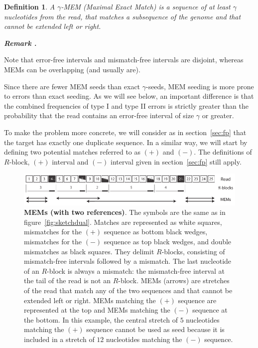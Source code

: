 \documentclass{article}
\newtheorem{definition}{Definition}
\newcounter{remarkcounter}
\newenvironment{remark}
{\small\it\vspace{0.5\baselineskip}
  \refstepcounter{remarkcounter}%
  \noindent\textbf{Remark \arabic{remarkcounter}.}%
}{\vspace{0.5\baselineskip}}
\begin{document}
\begin{definition}
A $\gamma$-MEM (Maximal Exact Match) is a sequence of at least $\gamma$
nucleotides from the read, that matches a subsequence of the genome and
that cannot be extended left or right.
\end{definition}

\begin{remark}
Note that error-free intervals and mismatch-free intervals are disjoint,
whereas MEMs can be overlapping (and usually are).
\end{remark}

Since there are fewer MEM seeds than exact $\gamma$-seeds, MEM seeding is
more prone to errors than exact seeding. As we will see below, an
important difference is that the combined frequencies of type I and type
II errors is strictly greater than the probability that the read contains
an error-free interval of size $\gamma$ or greater.


To make the problem more concrete, we will consider as in
section~\ref{sec:fp} that the target has exactly one duplicate sequence.
In a similar way, we will start by defining two potential matches referred
to as $(+)$ and $(-)$. The definitions of $R$-block, $(+)$ interval and
$(-)$ interval given in section~\ref{sec:fp} still apply.


\begin{figure}[h]
\centering
\includegraphics[scale=0.88]{sketch_MEM.pdf}
\caption{\textbf{MEMs (with two references)}. The symbols are the
same as in figure~\ref{fig:sketchdual}. Matches are represented as white
squares, mismatches for the $(+)$ sequence as bottom black wedges,
mismatches for the $(-)$ sequence as top black wedges, and double
mismatches as black squares. They delimit $R$-blocks, consisting of
mismatch-free intervals followed by a mismatch. The last nucleotide of
an $R$-block is always a mismatch: the mismatch-free interval at the
tail of the read is not an $R$-block. MEMs (arrows) are stretches of the
read that match any of the two sequences and that cannot be extended left
or right. MEMs matching the $(+)$ sequence are represented at the top and
MEMs matching the $(-)$ sequence at the bottom. In this example, the
central stretch of $5$ nucleotides matching the $(+)$ sequence cannot be
used as seed because it is included in a stretch of $12$ nucleotides
matching the $(-)$ sequence.}
\label{fig:sketchmem}
\end{figure}
\end{document}
